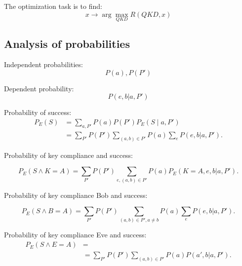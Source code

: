 \documentclass[a4paper,twocolumn,11pt,unpublished]{quantumarticle}
\begin{document}
The optimization task is to find:
\begin{equation}
    x \to \arg \max_{QKD} R(QKD,x) 
\end{equation}

\subsection{Analysis of probabilities}
Independent probabilities: 
\begin{equation}
    P(a), P(P')
\end{equation}

Dependent probability:
\begin{equation}
    P(e,b|a,P')
\end{equation}

Probability of success:
\begin{equation}
    \begin{split}
P_E(S) &= \sum_{a,P'} P(a)P(P') P_E(S \mid a, P') \\
       &= \sum_{P'} P(P') \sum_{(a,b) \in P'} P(a) \sum_e P(e,b|a,P').
    \end{split}
\end{equation}


Probability of key compliance and success:
\begin{widetext}
\begin{equation}
    P_E(S \wedge K=A) = \sum_{P'} P(P') 
    \sum_{e,(a,b) \in P'} P(a) P_E(K=A,e,b|a,P').
\end{equation}
\end{widetext}

Probability of key compliance Bob and success:
\begin{widetext}
\begin{equation}
 P_E(S \wedge B=A) =\sum_{P'} P(P') \sum_{(a,b) \in P', a\neq b} P(a) \sum_e
P(e,b|a,P').
\end{equation}
\end{widetext}

Probability of key compliance Eve and success:
\small{
\begin{equation}
\begin{split}
    P_E(S \wedge E=A) &= \\ 
    &= \sum_{P'} P(P') \sum_{(a,b) \in P'} P(a) P(a',b|a,P').
\end{split}
\end{equation}}
\end{document}
